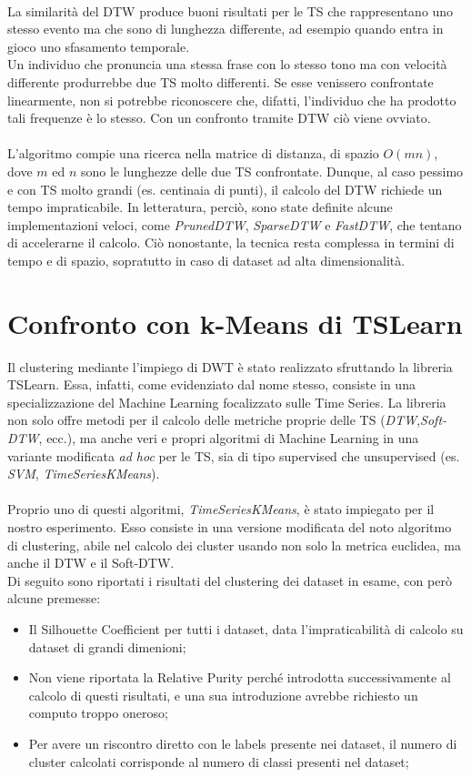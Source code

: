 \\
La similarità del DTW produce buoni risultati per le TS che rappresentano uno stesso evento ma che sono di lunghezza differente, ad esempio quando entra in gioco uno sfasamento temporale.\\
Un individuo che pronuncia una stessa frase con lo stesso tono ma con velocità differente produrrebbe due TS molto differenti. Se esse venissero confrontate linearmente, non si potrebbe riconoscere che, difatti, l'individuo che ha prodotto tali frequenze è lo stesso. Con un confronto tramite DTW ciò viene ovviato.\\
\\
L'algoritmo compie una ricerca nella matrice di distanza, di spazio $O(mn)$, dove $m$ ed $n$ sono le lunghezze delle due TS confrontate.
Dunque, al caso pessimo e con TS molto grandi (es. centinaia di punti), il calcolo del DTW richiede un tempo impraticabile. In letteratura, perciò, sono state definite alcune implementazioni veloci, come \textit{PrunedDTW}, \textit{SparseDTW} e \textit{FastDTW}, che tentano di accelerarne il calcolo. Ciò nonostante, la tecnica resta complessa in termini di tempo e di spazio, sopratutto in caso di dataset ad alta dimensionalità.\\

\section{Confronto con k-Means di TSLearn}
Il clustering mediante l'impiego di DWT è stato realizzato sfruttando la libreria TSLearn.
Essa, infatti, come evidenziato dal nome stesso, consiste in una specializzazione del Machine Learning focalizzato sulle Time Series.
La libreria non solo offre metodi per il calcolo delle metriche proprie delle TS (\textit{DTW},\textit{Soft-DTW}, ecc.), ma anche veri e propri algoritmi di Machine Learning in una variante modificata \textit{ad hoc} per le TS, sia di tipo supervised che unsupervised (es. \textit{SVM}, \textit{TimeSeriesKMeans}).\\
\\
Proprio uno di questi algoritmi, \textit{TimeSeriesKMeans}, è stato impiegato per il nostro esperimento. 
Esso consiste in una versione modificata del noto algoritmo di clustering, abile nel calcolo dei cluster usando non solo la metrica euclidea, ma anche il DTW e il Soft-DTW.
\\
Di seguito sono riportati i risultati del clustering dei dataset in esame, con però alcune premesse:
\begin{itemize}
	\item Il Silhouette Coefficient per tutti i dataset, data l'impraticabilità di calcolo su dataset di grandi dimenioni;
	\item Non viene riportata la Relative Purity perché introdotta successivamente al calcolo di questi risultati, e una sua introduzione avrebbe richiesto un computo troppo oneroso;
	\item Per avere un riscontro diretto con le labels presente nei dataset, il numero di cluster calcolati corrisponde al numero di classi presenti nel dataset;
\end{itemize}

